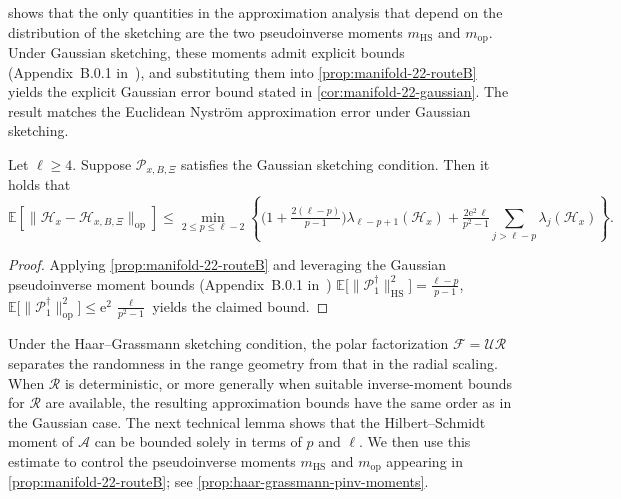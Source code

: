 \documentclass[final,onefignum,onetabnum]{siamart250211}
\begin{document}
 shows that the only quantities in the approximation analysis that depend on the distribution of the sketching are the two pseudoinverse moments $m_{\mathrm{HS}}$ and $m_{\mathrm{op}}$.
Under Gaussian sketching, these moments admit explicit bounds (Appendix~B.0.1 in~\cite{Frangella2023}), and substituting them into \cref{prop:manifold-22-routeB} yields the explicit Gaussian error bound stated in \cref{cor:manifold-22-gaussian}. The result matches the Euclidean Nystr\"om approximation error under Gaussian sketching.




\begin{corollary}
  \label{cor:manifold-22-gaussian}
  Let $\ell\ge 4$.
  Suppose $\mathcal{P}_{x, B, \Xi}$ satisfies the Gaussian sketching condition.
  Then it holds that
  \[
  \mathbb E\left[ \big\|\mathcal{H}_x-\mathcal{H}_{x, B, \Xi}\big\|_{\mathrm{op}} \right]
  \le
  \min_{2\le p\le \ell-2}
  \left\{
  \Big(1+\tfrac{2(\ell-p)}{p-1}\Big)\lambda_{\ell-p+1}(\mathcal{H}_x)
  +\tfrac{2\mathrm e^2\,\ell}{p^{2}-1}\sum_{j>\ell-p}\lambda_j(\mathcal{H}_x)
  \right\}.
  \]
\end{corollary}

\begin{proof}
Applying \cref{prop:manifold-22-routeB} and leveraging the Gaussian pseudoinverse moment bounds (Appendix~B.0.1 in~\cite{Frangella2023})
$
\mathbb E\big[\|\mathcal P_1^{\dagger}\|_{\mathrm{HS}}^{2}\big]=\frac{\ell-p}{p-1}
$,
$
\mathbb E\big[\|\mathcal P_1^{\dagger}\|_{\mathrm{op}}^{2}\big]\le \mathrm e^{2}\,\frac{\ell}{p^{2}-1}
$
yields the claimed bound.
\end{proof}


Under the Haar--Grassmann sketching condition, the polar factorization $\mathcal F=\mathcal U\mathcal R$ separates the randomness in the range geometry from that in the radial scaling. When $\mathcal R$ is deterministic, or more generally when suitable inverse-moment bounds for $\mathcal R$ are available, the resulting approximation bounds have the same order as in the Gaussian case. The next technical lemma shows that the Hilbert--Schmidt moment of $\mathcal A$ can be bounded solely in terms of $p$ and $\ell$. We then use this estimate to control the pseudoinverse moments $m_{\mathrm{HS}}$ and $m_{\mathrm{op}}$ appearing in \cref{prop:manifold-22-routeB}; see \cref{prop:haar-grassmann-pinv-moments}.
\end{document}
